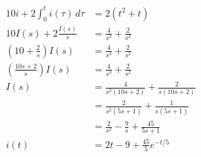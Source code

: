 \documentclass{article}
\begin{document}
\begin{align*}
  10 i + 2 \int_0^t i(\tau) \,d\tau      & = 2 (t^2 + t)                                       \\
  10 I(s) + 2 \frac{I(s)}{s}             & = \frac{4}{s^3} + \frac{2}{s^2}                     \\
  \left( 10 + \frac{2}{s} \right) I(s)   & = \frac{4}{s^3} + \frac{2}{s^2}                     \\
  \left( \frac{10 s + 2}{s} \right) I(s) & = \frac{4}{s^3} + \frac{2}{s^2}                     \\
  I(s)                                   & = \frac{4}{s^2 (10 s + 2)} + \frac{2}{s (10 s + 2)} \\
                                         & = \frac{2}{s^2 (5 s + 1)} + \frac{1}{s (5 s + 1)}   \\
                                         & = \frac{2}{s^2} - \frac{9}{s} + \frac{45}{5 s + 1}  \\
  i(t)                                   & = 2 t - 9 + \frac{45}{5} e^{-t / 5}
\end{align*}
\end{document}
